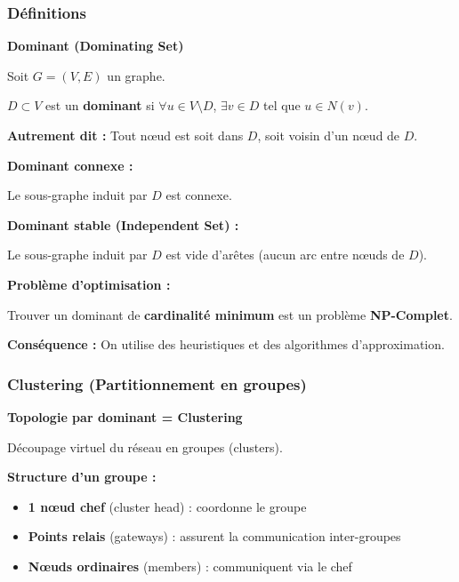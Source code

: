 \documentclass[12pt,a4paper]{article}
\begin{document}
\subsubsection{Définitions}

\begin{definition}
\textbf{Dominant (Dominating Set)}

Soit $G = (V, E)$ un graphe.

$D \subset V$ est un \textcolor{titrebleu}{\textbf{dominant}} si $\forall u \in V \setminus D$, $\exists v \in D$ tel que $u \in N(v)$.

\textbf{Autrement dit :} Tout nœud est soit dans $D$, soit voisin d'un nœud de $D$.

\textbf{Dominant connexe :}

Le sous-graphe induit par $D$ est connexe.

\textbf{Dominant stable (Independent Set) :}

Le sous-graphe induit par $D$ est vide d'arêtes (aucun arc entre nœuds de $D$).
\end{definition}

\begin{important}
\textbf{Problème d'optimisation :}

Trouver un dominant de \textcolor{importantrouge}{\textbf{cardinalité minimum}} est un problème \textcolor{importantrouge}{\textbf{NP-Complet}}.

\textbf{Conséquence :} On utilise des heuristiques et des algorithmes d'approximation.
\end{important}

\subsubsection{Clustering (Partitionnement en groupes)}

\begin{definition}
\textbf{Topologie par dominant = Clustering}

Découpage virtuel du réseau en groupes (clusters).

\textbf{Structure d'un groupe :}
\begin{itemize}
    \item \textcolor{titrebleu}{\textbf{1 nœud chef}} (cluster head) : coordonne le groupe
    \item \textcolor{defvert}{\textbf{Points relais}} (gateways) : assurent la communication inter-groupes
    \item \textcolor{algoviolet}{\textbf{Nœuds ordinaires}} (members) : communiquent via le chef
\end{itemize}
\end{definition}
\end{document}
